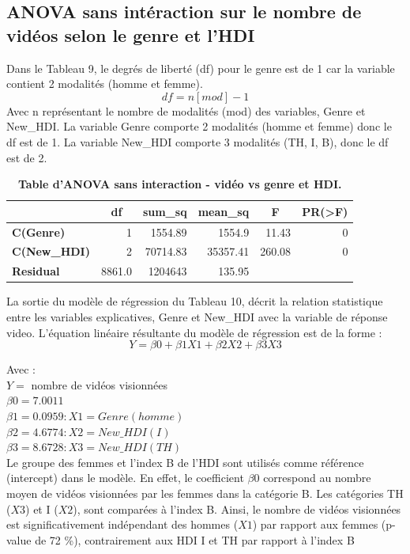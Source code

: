 \documentclass[12pt, a4paper, titlepage, table]{article}
\begin{document}
	\subsection{ANOVA sans intéraction sur le nombre de vidéos selon le genre et l'HDI}
	
	Dans le Tableau 9, le degrés de liberté (df) pour le genre est de 1 car la variable contient 2 modalités (homme et femme).
	\[ df = n[mod] - 1 \]
	Avec n représentant le nombre de modalités (mod) des variables, Genre et New\_HDI.
	La variable Genre comporte 2 modalités (homme et femme) donc le df est de 1. La variable New\_HDI comporte 3 modalités (TH, I, B), donc le df est de 2.
	  
	\begin{table}[H]
		\centering
		\fontsize{12}{20}\selectfont
		\begin{tabular}{|l|r|r|r|r|r|}
			\hline
					\multicolumn{1}{|c|}{\textbf{}}&
					\multicolumn{1}{c|}{\textbf{df}}&
					\multicolumn{1}{c|}{\textbf{sum\_sq}}&
					\multicolumn{1}{c|}{\textbf{mean\_sq}}&
					\multicolumn{1}{c|}{\textbf{F}}&
					\multicolumn{1}{c|}{\textbf{PR(>F)}}\\
			\hline
				\textbf{C(Genre)}&	1&	1554.89&	1554.9&	11.43&	0\\
				\textbf{C(New\_HDI)}&	2&	70714.83&	35357.41&	260.08&	0\\
				\textbf{Residual}&	8861.0&	1204643&	135.95&		&		\\
			\hline
		\end{tabular}
		\caption{\textbf{Table d'ANOVA sans interaction - vidéo vs genre et HDI.}}
	\end{table}

	La sortie du modèle de régression du Tableau 10, décrit la relation statistique entre les variables explicatives, Genre et New\_HDI avec la variable de réponse video. L'équation linéaire résultante du modèle de régression est de la forme : 
	\[ Y=\beta0 + \beta1X1 + \beta2X2 + \beta3X3 \]
	
	Avec :\\
	$Y =$ nombre de vidéos visionnées\\
	$\beta0 = 7.0011$\\
	$\beta1 = 0.0959 : X1 = Genre(homme)$\\
	$\beta2 = 4.6774 : X2 = New\_HDI(I)$\\
	$\beta3 = 8.6728 : X3 = New\_HDI(TH)$\\
	
	Le groupe des femmes et l'index B de l'HDI sont utilisés comme référence (intercept) dans le modèle.
	En effet, le coefficient $\beta0$ correspond au nombre moyen de vidéos visionnées par les femmes dans la catégorie B. Les catégories TH ($X3$) et I ($X2$), sont comparées à l'index B.
	Ainsi, le nombre de vidéos visionnées est significativement indépendant des hommes ($X1$) par rapport aux femmes (p-value de 72 \%), contrairement aux HDI I et TH par rapport à l'index B
	
\end{document}
